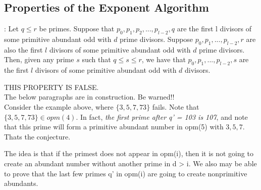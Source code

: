 \documentclass[../paper.tex]{subfiles}
\begin{document}
\subsection{Properties of the Exponent Algorithm}

\begin{theorem}[Property 1]

\end{theorem}

\begin{conj}:
Let $q \leq r$ be primes. Suppose that $p_0, p_1, p_2, ..., 
p_{l-2}, q$ are the first l divisors of some primitive abundant
odd with $d$ prime divisors. Suppose $p_0, p_1, ..., p_{l-2},r$ 
are also the first $l$ divisors of some primitive abundant odd
with $d$ prime divisors. Then, given any prime $s$ such that $q \leq s 
\leq r$, we have that $p_0, p_1,..., p_{l-2}, s$ are the first $l$
divisors of some primitive abundant odd with $d$ divisors.
\end{conj}

THIS PROPERTY IS FALSE.
\\

The below paragraphs are in construction. Be warned!!
\\







Consider the example above, where $\{3,5,7,73\}$ fails.
Note that $\{3,5,7,73\} \in opm(4)$. In fact, \textit{the first
prime after q' = 103 is 107}, and note that this prime will form a
primitive abundant number in opm(5) with $3,5,7$. Thats the
conjecture.


The idea is that if the primest does not appear in opm(i), then it
is not going to create an abundant number without another prime in
d > i. We also may be able to prove that the last few primes q' in
opm(i) are going to create nonprimitive abundants.
\\
\end{document}
